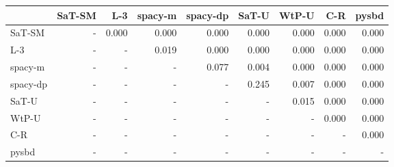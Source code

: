 \begin{tabular}{lrrrrrrrr}
\toprule
 & SaT-SM & L-3 & spacy-m & spacy-dp & SaT-U & WtP-U & C-R & pysbd \\
\midrule
SaT-SM & - & 0.000 & 0.000 & 0.000 & 0.000 & 0.000 & 0.000 & 0.000 \\
L-3 & - & - & 0.019 & 0.000 & 0.000 & 0.000 & 0.000 & 0.000 \\
spacy-m & - & - & - & 0.077 & 0.004 & 0.000 & 0.000 & 0.000 \\
spacy-dp & - & - & - & - & 0.245 & 0.007 & 0.000 & 0.000 \\
SaT-U & - & - & - & - & - & 0.015 & 0.000 & 0.000 \\
WtP-U & - & - & - & - & - & - & 0.000 & 0.000 \\
C-R & - & - & - & - & - & - & - & 0.000 \\
pysbd & - & - & - & - & - & - & - & - \\
\bottomrule
\end{tabular}

